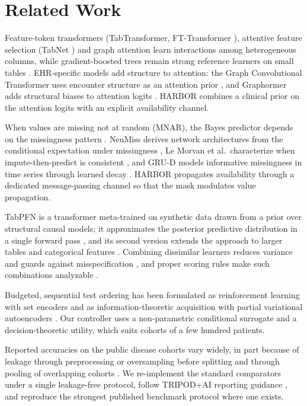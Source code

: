 \section{Related Work}\label{sec:related}
Feature-token transformers (TabTransformer, FT-Transformer \cite{tabtransformer,gorishniy2021}), attentive feature selection (TabNet \cite{tabnet}) and graph attention \cite{gat} learn interactions among heterogeneous columns, while gradient-boosted trees remain strong reference learners on small tables \cite{grinsztajn2022,xgboost,catboost}. EHR-specific models add structure to attention: the Graph Convolutional Transformer uses encounter structure as an attention prior \cite{gct}, and Graphormer adds structural biases to attention logits \cite{graphormer}. HARBOR combines a clinical prior on the attention logits with an explicit availability channel.

When values are missing not at random (MNAR), the Bayes predictor depends on the missingness pattern \cite{littlerubin}. NeuMiss derives network architectures from the conditional expectation under missingness \cite{neumiss}, Le Morvan et al.\ characterize when impute-then-predict is consistent \cite{lemorvan2021}, and GRU-D models informative missingness in time series through learned decay \cite{grud}. HARBOR propagates availability through a dedicated message-passing channel so that the mask modulates value propagation.

TabPFN is a transformer meta-trained on synthetic data drawn from a prior over structural causal models; it approximates the posterior predictive distribution in a single forward pass \cite{tabpfn}, and its second version extends the approach to larger tables and categorical features \cite{tabpfn2}. Combining dissimilar learners reduces variance and guards against misspecification \cite{superlearner,deepensembles}, and proper scoring rules make such combinations analyzable \cite{gneiting}.

Budgeted, sequential test ordering has been formulated as reinforcement learning with set encoders \cite{shim2018} and as information-theoretic acquisition with partial variational autoencoders \cite{eddi}. Our controller uses a non-parametric conditional surrogate and a decision-theoretic utility, which suits cohorts of a few hundred patients.

Reported accuracies on the public disease cohorts vary widely, in part because of leakage through preprocessing or oversampling before splitting and through pooling of overlapping cohorts \cite{kapoor2023}. We re-implement the standard comparators under a single leakage-free protocol, follow TRIPOD+AI reporting guidance \cite{tripod}, and reproduce the strongest published benchmark protocol where one exists.
